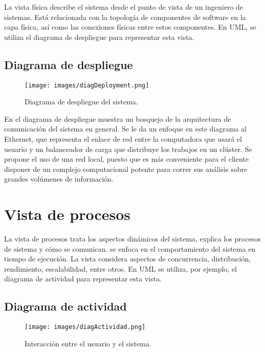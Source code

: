 \documentclass{scrreprt}
\begin{document}
La vista física describe el sistema desde el punto de vista de un ingeniero de sistemas. Está relacionada con la topología de componentes de software en la capa física, así como las conexiones físicas entre estos componentes. En UML, se utiliza el diagrama de despliegue para representar esta vista.\\

\section{Diagrama de despliegue}

\begin{figure}[H]
	\centering
    \texttt{[image: images/diagDeployment.png]}
    \caption{Diagrama de despliegue del sistema.}
\end{figure}

En el diagrama de despliegue muestra un bosquejo de la arquitectura de comunicación del sistema en general. Se le da un enfoque en este diagrama al Ethernet, que representa el enlace de red entre la computadora que usará el usuario y un balanceador de carga que distribuye los trabajos en un clúster. Se propone el uso de una red local, puesto que es más conveniente para el cliente disponer de un complejo computacional potente para correr sus análisis sobre grandes volúmenes de información.


\chapter{Vista de procesos}

La vista de procesos trata los aspectos dinámicos del sistema, explica los procesos de sistema y cómo se comunican. se enfoca en el comportamiento del sistema en tiempo de ejecución. La vista considera aspectos de concurrencia, distribución, rendimiento, escalabilidad, entre otros. En UML se utiliza, por ejemplo, el diagrama de actividad para representar esta vista.\\

\section{Diagrama de actividad}

\begin{figure}[H]
	\centering
    \texttt{[image: images/diagActividad.png]}
    \caption{Interacción entre el usuario y el sistema.}
\end{figure}
\end{document}
